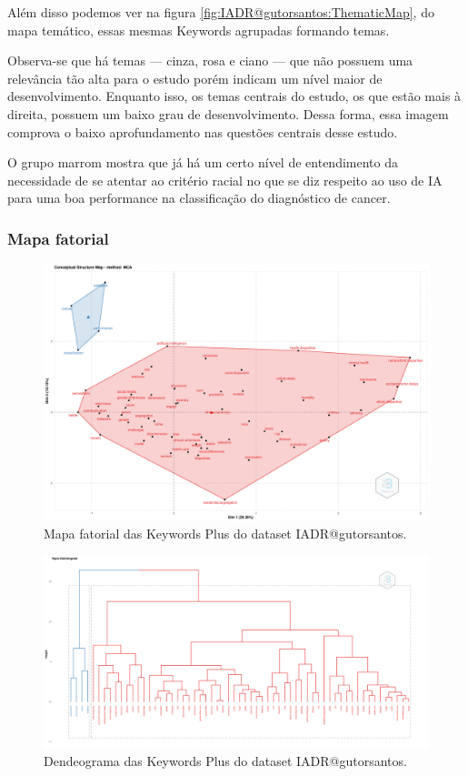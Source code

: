 Além disso podemos ver na figura \ref{fig:IADR@gutorsantos:ThematicMap}, do mapa temático, essas mesmas Keywords agrupadas formando temas. 

Observa-se que há temas --- cinza, rosa e ciano --- que não possuem uma relevância tão alta para o estudo porém indicam um nível maior de desenvolvimento. Enquanto isso, os temas centrais do estudo, os que estão mais à direita, possuem um baixo grau de desenvolvimento. Dessa forma, essa imagem comprova o baixo aprofundamento nas questões centrais desse estudo.

O grupo marrom mostra que já há um certo nível de entendimento da necessidade de se atentar ao critério racial no que se diz respeito ao uso de IA para uma boa performance na classificação do diagnóstico de cancer. 

\subsubsection{Mapa fatorial}
\begin{figure}[H]
    \centering
\includegraphics[angle=0,width=1\textwidth]{experiments/gutorsantos/AnaliseBibliometrica/IAeDiscriminacao/imgs/FactorialMap-2022-02-09.png}
    \caption{Mapa fatorial das Keywords Plus do dataset IADR@gutorsantos.}
    \label{fig:IADR@gutorsantos:FactorialMap}
\end{figure}

\begin{figure}[H]
    \centering
\includegraphics[angle=0,width=1\textwidth]{experiments/gutorsantos/AnaliseBibliometrica/IAeDiscriminacao/imgs/Dendrogram-2022-02-09.png}
    \caption{Dendeograma das Keywords Plus do dataset IADR@gutorsantos.}
    \label{fig:IADR@gutorsantos:Dendeogram}
\end{figure}


